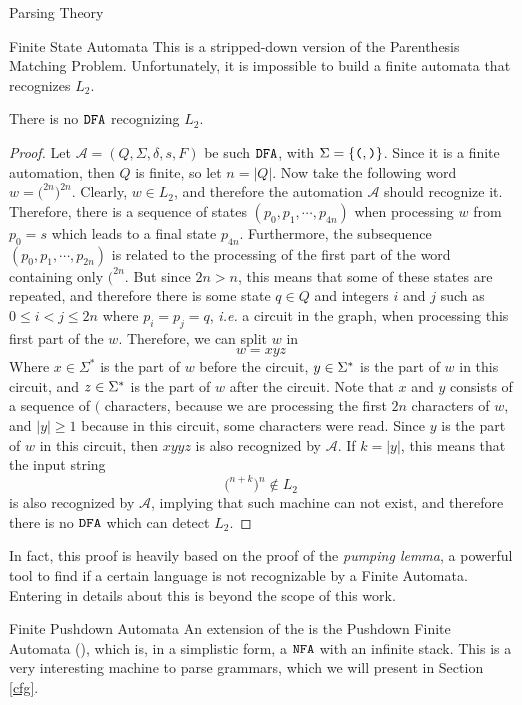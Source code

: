 \begin{section}{Parsing Theory}
\begin{subsection}{Finite State Automata}
This is a stripped-down version of the Parenthesis Matching Problem.
Unfortunately, it is impossible to build a finite automata
that recognizes $L_2$.

\begin{lemma}
There is no $\texttt{DFA}$ recognizing $L_2$.
\end{lemma}
\begin{proof}
Let $\mathcal{A} = (Q, \Sigma, \delta, s, F)$ be such $\texttt{DFA}$,
with $\Sigma = \{\texttt{(}, \texttt{)}\}$.
Since it is a finite automation, then $Q$ is finite, so let
$n = |Q|$. Now take the following word $w = \texttt{(}^{2n}\texttt{)}^{2n}$.
Clearly, $w \in L_2$, and therefore the automation $\mathcal{A}$ should
recognize it. Therefore, there is a sequence of states
$(p_0, p_1, \cdots, p_{4n})$ when processing $w$ from $p_0 = s$ which leads to a
final state $p_{4n}$. Furthermore, the subsequence $(p_0, p_1, \cdots, p_{2n})$ is
related to the processing of the first part of the word containing only
$\texttt{(}^{2n}$. But since $2n > n$, this means that some of these
states are repeated, and therefore there is some state $q \in Q$ and integers
$i$ and $j$ such as $0 \leq i < j \leq 2n$ where $p_i = p_j = q$,
\textit{i.e.} a circuit in the graph, when processing this first part of the $w$.
Therefore, we can split $w$ in 
$$w = xyz$$
Where $x \in \Sigma^*$ is the part of $w$ before the circuit, $y \in \Sigma^*$ is
the part of $w$ in this circuit, and $z \in \Sigma^*$ is the part of $w$ after the
circuit. Note that $x$ and $y$ consists of a sequence of $\texttt{(}$
characters, because we are processing the first $2n$ characters of $w$,
and $|y| \geq 1$ because in this circuit, some characters were
read.
Since $y$ is the part of $w$ in this circuit, then
$ xyyz $
is also recognized by $\mathcal{A}$. If $k = |y|$, this means that
the input string
$$ \texttt{(}^{n+k}\texttt{)}^n \not\in L_2$$
is also recognized by $\mathcal{A}$, implying that such machine can
not exist, and therefore there is no $\texttt{DFA}$ which can detect
$L_2$.
\end{proof}

In fact, this proof is heavily based on the proof of the \textit{pumping lemma},
a powerful tool to find if a certain language is not recognizable by a
Finite Automata. Entering in details about this is beyond the scope of
this work.

\end{subsection}

\begin{subsection}{Finite Pushdown Automata}
	An extension of the \NFA is the Pushdown Finite Automata (), which
	is, in a simplistic form, a $\texttt{NFA}$ with an infinite stack. This is a very
	interesting machine to parse grammars, which we will present in Section
	\ref{cfg}.


\end{subsection}
\end{section}
